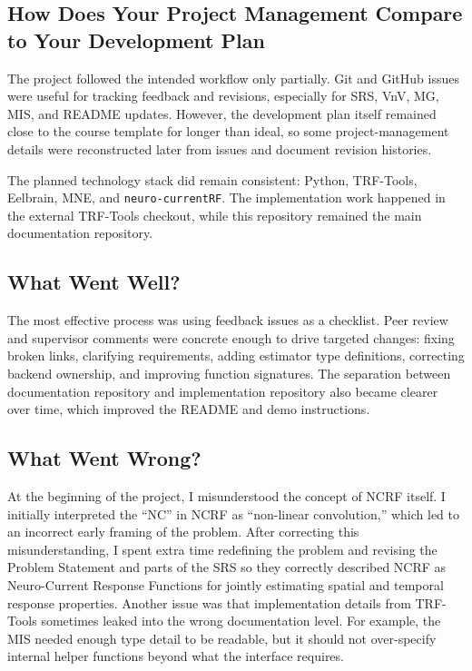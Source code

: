 \documentclass{article}
\begin{document}
\subsection{How Does Your Project Management Compare to Your Development Plan}


The project followed the intended workflow only partially. Git and GitHub issues were useful for tracking feedback and revisions, especially for SRS, VnV, MG, MIS, and README updates. However, the development plan itself remained close to the course template for longer than ideal, so some project-management details were reconstructed later from issues and document revision histories.

The planned technology stack did remain consistent: Python, TRF-Tools, Eelbrain, MNE, and \texttt{neuro-currentRF}. The implementation work happened in the external TRF-Tools checkout, while this repository remained the main documentation repository.

\subsection{What Went Well?}


The most effective process was using feedback issues as a checklist. Peer review and supervisor comments were concrete enough to drive targeted changes: fixing broken links, clarifying requirements, adding estimator type definitions, correcting backend ownership, and improving function signatures. The separation between documentation repository and implementation repository also became clearer over time, which improved the README and demo instructions.

\subsection{What Went Wrong?}


At the beginning of the project, I misunderstood the concept of NCRF itself. I initially interpreted the ``NC'' in NCRF as ``non-linear convolution,'' which led to an incorrect early framing of the problem. After correcting this misunderstanding, I spent extra time redefining the problem and revising the Problem Statement and parts of the SRS so they correctly described NCRF as Neuro-Current Response Functions for jointly estimating spatial and temporal response properties. Another issue was that implementation details from TRF-Tools sometimes leaked into the wrong documentation level. For example, the MIS needed enough type detail to be readable, but it should not over-specify internal helper functions beyond what the interface requires.
\end{document}
